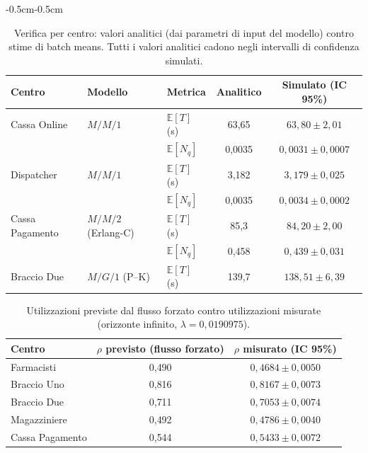 \documentclass{article}
\begin{document}
\begin{adjustwidth}{-0.5cm}{-0.5cm}
\begin{table}[ht]
\centering
\renewcommand{\arraystretch}{1.25}
\begin{tabular}{|l|l|l|c|c|}
\hline
\textbf{Centro} & \textbf{Modello} & \textbf{Metrica} & \textbf{Analitico} & \textbf{Simulato (IC 95\%)} \\
\hline
Cassa Online & $M/M/1$ & $\mathbb{E}[T]$ (s) & 63{,}65 & $63{,}80 \pm 2{,}01$ \\
             &         & $\mathbb{E}[N_q]$   & 0{,}0035 & $0{,}0031 \pm 0{,}0007$ \\
\hline
Dispatcher   & $M/M/1$ & $\mathbb{E}[T]$ (s) & 3{,}182 & $3{,}179 \pm 0{,}025$ \\
             &         & $\mathbb{E}[N_q]$   & 0{,}0035 & $0{,}0034 \pm 0{,}0002$ \\
\hline
Cassa Pagamento & $M/M/2$ (Erlang-C) & $\mathbb{E}[T]$ (s) & 85{,}3 & $84{,}20 \pm 2{,}00$ \\
                &                    & $\mathbb{E}[N_q]$   & 0{,}458 & $0{,}439 \pm 0{,}031$ \\
\hline
Braccio Due  & $M/G/1$ (P--K) & $\mathbb{E}[T]$ (s) & 139{,}7 & $138{,}51 \pm 6{,}39$ \\
\hline
\end{tabular}
\caption{Verifica per centro: valori analitici (dai parametri di input del modello) contro stime
di batch means. Tutti i valori analitici cadono negli intervalli di confidenza simulati.}
\end{table}

\begin{table}[ht]
\centering
\renewcommand{\arraystretch}{1.25}
\begin{tabular}{|l|c|c|}
\hline
\textbf{Centro} & $\rho$ \textbf{previsto (flusso forzato)} & $\rho$ \textbf{misurato (IC 95\%)} \\
\hline
Farmacisti & 0{,}490 & $0{,}4684 \pm 0{,}0050$ \\
Braccio Uno     & 0{,}816 & $0{,}8167 \pm 0{,}0073$ \\
Braccio Due     & 0{,}711 & $0{,}7053 \pm 0{,}0074$ \\
Magazziniere    & 0{,}492 & $0{,}4786 \pm 0{,}0040$ \\
Cassa Pagamento & 0{,}544 & $0{,}5433 \pm 0{,}0072$ \\
\hline
\end{tabular}
\caption{Utilizzazioni previste dal flusso forzato contro utilizzazioni misurate (orizzonte
infinito, $\lambda = 0{,}0190975$).}
\end{table}


\end{adjustwidth}
\end{document}
